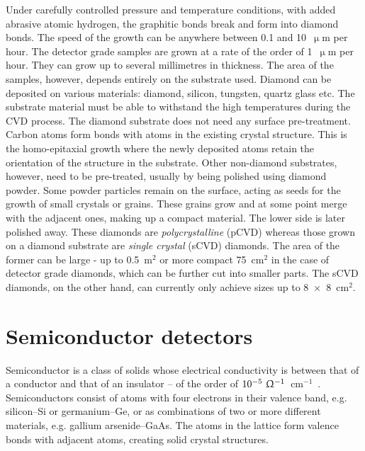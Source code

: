 \begin{description}
Under carefully controlled pressure and temperature conditions, with added abrasive atomic hydrogen, the graphitic bonds break and form into diamond bonds. The speed of the growth can be anywhere between 0.1 and 10~$\upmu$m per hour. The detector grade samples are grown at a rate of the order of 1~$\upmu$m per hour. They can grow up to several millimetres in thickness. The area of the samples, however, depends entirely on the substrate used. Diamond can be deposited on various materials: diamond, silicon, tungsten, quartz glass etc. The substrate material must be able to withstand the high temperatures during the CVD process. The diamond substrate does not need any surface pre-treatment. Carbon atoms form bonds with atoms in the existing crystal structure. This is the homo-epitaxial growth where the newly deposited atoms retain the orientation of the structure in the substrate. Other non-diamond substrates, however, need to be pre-treated, usually by being polished using diamond powder. Some powder particles remain on the surface, acting as seeds for the growth of small crystals or grains. These grains grow and at some point merge with the adjacent ones, making up a compact material. The lower side is later polished away. These diamonds are \emph{polycrystalline} (pCVD) whereas those grown on a diamond substrate are \emph{single crystal} (sCVD) diamonds. The area of the former can be large - up to 0.5~m$^2$ or more compact 75~cm$^2$ in the case of detector grade diamonds, which can be further cut into smaller parts. The sCVD diamonds, on the other hand, can currently only achieve sizes up to 8~$\times$~8~cm$^2$.
\end{description}




\section{Semiconductor detectors}
Semiconductor is a class of solids whose electrical conductivity is between that of a conductor and that of an insulator -- of the order of  $10^{-5}~\Upomega^{-1}$~cm$^{-1}$~\cite{PHSEM:00000}. Semiconductors consist of atoms with four electrons in their valence band, e.g. silicon--Si or germanium--Ge, or as combinations of two or more different materials, e.g. gallium arsenide--GaAs. The atoms in the lattice form valence bonds with adjacent atoms, creating solid crystal structures.

